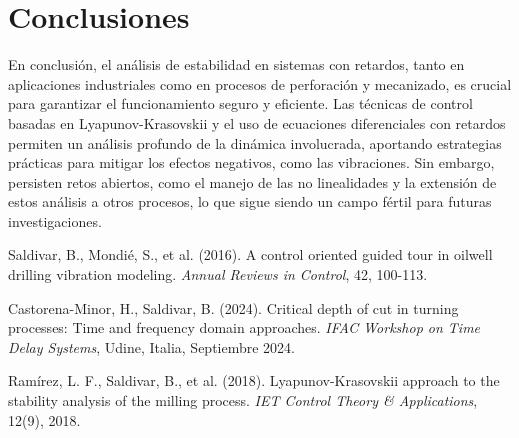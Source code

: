 \documentclass[conference]{IEEEtran}
\begin{document}
\section*{Conclusiones}

En conclusión, el análisis de estabilidad en sistemas con retardos, tanto en aplicaciones industriales como en procesos de perforación y mecanizado, es crucial para garantizar el funcionamiento seguro y eficiente. Las técnicas de control basadas en Lyapunov-Krasovskii y el uso de ecuaciones diferenciales con retardos permiten un análisis profundo de la dinámica involucrada, aportando estrategias prácticas para mitigar los efectos negativos, como las vibraciones. Sin embargo, persisten retos abiertos, como el manejo de las no linealidades y la extensión de estos análisis a otros procesos, lo que sigue siendo un campo fértil para futuras investigaciones.

\begin{thebibliography}{00}
	Saldivar, B., Mondié, S., et al. (2016). A control oriented guided tour in oilwell drilling vibration modeling. \textit{Annual Reviews in Control}, 42, 100-113.

	Castorena-Minor, H., Saldivar, B. (2024). Critical depth of cut in turning processes: Time and frequency domain approaches. \textit{IFAC Workshop on Time Delay Systems}, Udine, Italia, Septiembre 2024.

	Ramírez, L. F., Saldivar, B., et al. (2018). Lyapunov-Krasovskii approach to the stability analysis of the milling process. \textit{IET Control Theory \& Applications}, 12(9), 2018.


\end{thebibliography}
\end{document}
